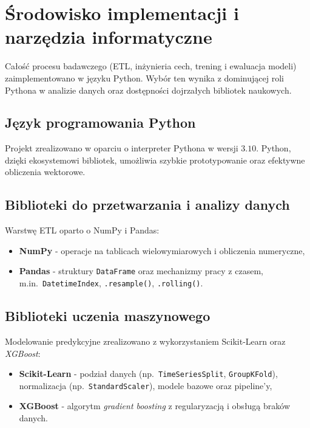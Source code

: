 \section{Środowisko implementacji i narzędzia informatyczne}

Całość procesu badawczego (ETL, inżynieria cech, trening i ewaluacja modeli) zaimplementowano w języku Python.
Wybór ten wynika z dominującej roli Pythona w analizie danych oraz dostępności dojrzałych bibliotek naukowych.

\subsection{Język programowania Python}

Projekt zrealizowano w oparciu o interpreter Pythona w wersji $3.10$.
Python, dzięki ekosystemowi bibliotek, umożliwia szybkie prototypowanie oraz efektywne obliczenia wektorowe.

\subsection{Biblioteki do przetwarzania i analizy danych}

Warstwę ETL oparto o NumPy i Pandas:
\begin{itemize}
  \item \textbf{NumPy} - operacje na tablicach wielowymiarowych i obliczenia numeryczne,
  \item \textbf{Pandas} - struktury \texttt{DataFrame} oraz mechanizmy pracy z czasem, m.in.\ \texttt{DatetimeIndex}, \texttt{.resample()}, \texttt{.rolling()}.
\end{itemize}

\subsection{Biblioteki uczenia maszynowego}

Modelowanie predykcyjne zrealizowano z wykorzystaniem Scikit-Learn oraz \textit{XGBoost}:
\begin{itemize}
  \item \textbf{Scikit-Learn} - podział danych (np.\ \texttt{TimeSeriesSplit}, \texttt{GroupKFold}), normalizacja (np.\ \texttt{StandardScaler}), modele bazowe oraz pipeline'y,
  \item \textbf{XGBoost} - algorytm \textit{gradient boosting} z regularyzacją i obsługą braków danych.
\end{itemize}

